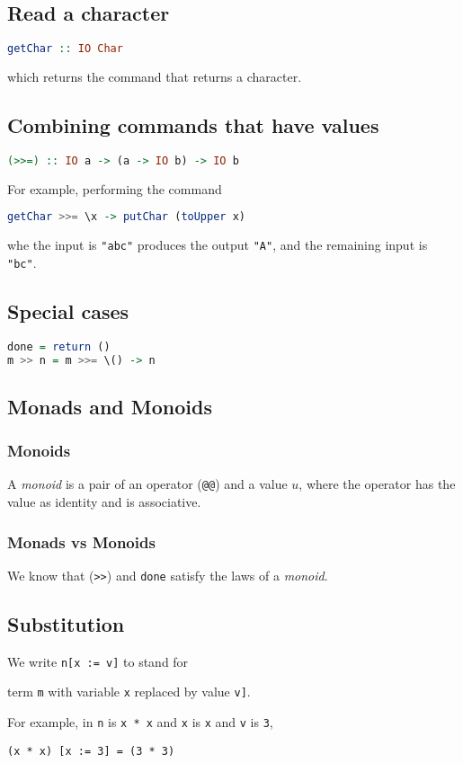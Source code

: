 \documentclass{article}
\begin{document}
\subsection{Read a character}
\begin{lstlisting}[language=haskell]
getChar :: IO Char
\end{lstlisting}
which returns the command that returns a character.
\subsection{Combining commands that have values}
\begin{lstlisting}[language=haskell]
(>>=) :: IO a -> (a -> IO b) -> IO b
\end{lstlisting}
For example, performing the command
\begin{lstlisting}[language=haskell]
getChar >>= \x -> putChar (toUpper x)
\end{lstlisting}
whe the input is \texttt{"abc"} produces the output \texttt{"A"}, and the remaining input is \texttt{"bc"}.
\subsection{Special cases}
\begin{lstlisting}[language=haskell]
done = return ()
m >> n = m >>= \() -> n
\end{lstlisting}
\subsection{Monads and Monoids}
\subsubsection{Monoids}
A \emph{monoid} is a pair of an operator (\texttt{@@}) and a value $u$, where the operator has the value as identity and is associative.
\subsubsection{Monads vs Monoids}
We know that (\texttt{>>}) and \texttt{done} satisfy the laws of a \emph{monoid}.
\subsection{Substitution}
We write \texttt{n[x := v]} to stand for
\begin{center}
    term \texttt{m} with variable \texttt{x} replaced by value \texttt{v]}.
\end{center}
For example, in \texttt{n} is \texttt{x * x} and \texttt{x} is \texttt{x} and \texttt{v} is \texttt{3},
\begin{center}
    \texttt{(x * x) [x := 3] = (3 * 3)}
\end{center}
\end{document}
